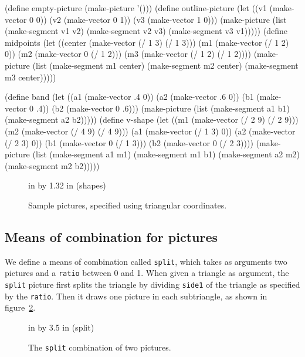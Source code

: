 \beginlisp
(define empty-picture (make-picture '()))
\null
(define outline-picture
  (let ((v1 (make-vector 0 0))
        (v2 (make-vector 0 1))
        (v3 (make-vector 1 0)))
    (make-picture (list (make-segment v1 v2)
                        (make-segment v2 v3)
                        (make-segment v3 v1)))))
\null
(define midpoints
  (let ((center (make-vector (/ 1 3) (/ 1 3)))
        (m1 (make-vector (/ 1 2) 0))
        (m2 (make-vector 0 (/ 1 2)))
        (m3 (make-vector (/ 1 2) (/ 1 2))))
    (make-picture (list (make-segment m1 center)
                        (make-segment m2 center)
                        (make-segment m3 center)))))

\null
(define band
  (let ((a1 (make-vector .4 0))
        (a2 (make-vector .6 0))
        (b1 (make-vector 0 .4))
        (b2 (make-vector 0 .6)))
    (make-picture (list (make-segment a1 b1)
                        (make-segment a2 b2)))))
\null
(define v-shape
  (let ((m1 (make-vector (/ 2 9) (/ 2 9)))
        (m2 (make-vector (/ 4 9) (/ 4 9)))
        (a1 (make-vector (/ 1 3) 0))
        (a2 (make-vector (/ 2 3) 0))
        (b1 (make-vector 0 (/ 1 3)))
        (b2 (make-vector 0 (/ 2 3))))
    (make-picture (list (make-segment a1 m1)
                        (make-segment m1 b1)
                        (make-segment a2 m2)
                        (make-segment m2 b2)))))

\endlisp

\begin{figure}
 in by 1.32 in (shapes)
\caption{{\protect\footnotesize
Sample pictures, specified using triangular coordinates.}}
\label{sample-figures}
\end{figure} 

\pagebreak
\subsection{Means of combination for pictures}

We define a means of combination called {\tt split}, which takes as
arguments two pictures and a {\tt ratio} between 0 and 1.  When given
a triangle as argument, the {\tt split} picture first splits the
triangle by dividing {\tt side1} of the triangle as specified by the
{\tt ratio}.  Then it draws one picture in each subtriangle, as shown
in figure~\ref{split}.


\begin{figure}
 in by 3.5 in (split)
\caption{{\protect\footnotesize
The {\tt split} combination of two pictures.}}
\label{split}
\end{figure} 

